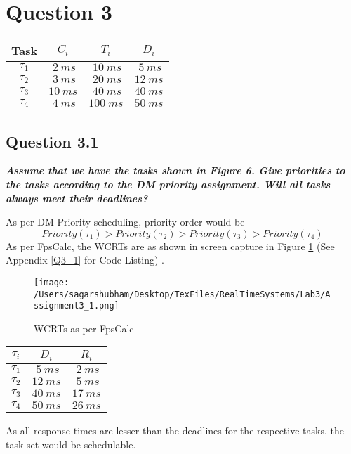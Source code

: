 \documentclass[oneside,a4paper]{article}
\begin{document}
\section{Question 3}
\begin{center}
\begin{tabular}{| c | c c c |}
\hline 
 Task & $C_i$ & $T_i$ & $D_i$ \\
 \hline
 $\tau_1$ & $\ 2\ ms$ & $\ 10\ ms$ & $\ 5\ ms$  \\
 $\tau_2$ & $\ 3\ ms$& $\ 20\ ms$ & $12\ ms$ \\
 $\tau_3$ & $10\ ms$& $\ 40\ ms$ & $40\ ms$ \\
 $\tau_4$ & $\ 4\ ms$& $100\ ms$ & $50\ ms$ \\
\hline
\end{tabular}
\end{center}\par
\subsection*{\normalsize{Question 3.1}}
\textit{\textbf{Assume that we have the tasks shown in Figure 6. Give priorities to the tasks according to the DM priority assignment. Will all tasks always meet their deadlines?}}\par
As per DM Priority scheduling, priority order would be
$$Priority(\tau_1) > Priority(\tau_2) > Priority(\tau_3) > Priority(\tau_4) $$
As per FpsCalc, the WCRTs are as shown in screen capture in Figure \ref{fig3_1} (See Appendix \ref{Q3_1} for Code Listing) .
\begin{center}
\begin{figure}[H]
                    \centering
                    \texttt{[image: /Users/sagarshubham/Desktop/TexFiles/RealTimeSystems/Lab3/Assignment3\_1.png]}
                    \caption[Figure for Question 3.1]{WCRTs as per FpsCalc}
                    \label{fig3_1}        
\end{figure}
\begin{tabular}{| c | c | c |}
\hline
\textbf{$\tau_i$} & \textbf{$D_i$} & \textbf{$R_i$} \\
\hline
$\tau_1$ & $\ 5\ ms$ & $\ 2\ ms$ \\
$\tau_2$ & $12 \ ms$ & $\ 5\ ms$ \\
$\tau_3$ & $40\ ms$ & $17\ ms$ \\
$\tau_4$ & $50\ ms$ & $26\ ms$ \\
\hline
\end{tabular}
\end{center}\par
As all response times are lesser than the deadlines for the respective tasks, the task set would be schedulable.
\pagebreak
\end{document}
